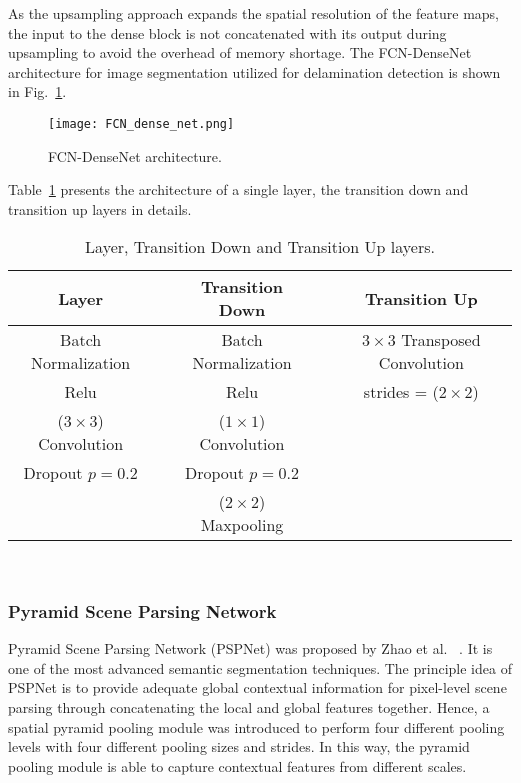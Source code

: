 As the upsampling approach expands the spatial resolution of the feature maps, the input to the dense block is not concatenated with its output during upsampling to avoid the overhead of memory shortage.
The FCN-DenseNet architecture for image segmentation utilized for delamination detection is shown in Fig.~\ref{fcn}.
\begin{figure} [h!]
	\begin{center}
		\texttt{[image: FCN\_dense\_net.png]}
	\end{center}
	\caption{FCN-DenseNet architecture.} 
	\label{fcn}
\end{figure}
Table~\ref{layers} presents the architecture of a single layer, the transition down  and transition up layers in details.
\begin{table}[h!]
	\renewcommand{\arraystretch}{1.3}
	\centering
	\scriptsize
	\resizebox{\textwidth}{!}
	{
		\begin{tabular}{ccccc}
			\hline
			Layer &  &  Transition Down &  &  Transition Up \\ 
			\hline
			Batch Normalization &  & Batch Normalization &  &  \(3\times 3\) Transposed Convolution  \\ 
			Relu &  & Relu &  & strides = (\(2\times2\))  \\ 
			(\(3\times3\)) Convolution &  & (\(1\times1\)) Convolution &  &  \\ 
			Dropout \(p=0.2\) &  &Dropout \(p=0.2\)  &  &  \\ 
			&  & (\(2\times2\)) Maxpooling &  &  \\ 
			\hline
		\end{tabular}
	}
	\caption{Layer, Transition Down and Transition Up layers.} 
	\label{layers}	
\end{table}\\
\subsubsection{Pyramid Scene Parsing Network}
Pyramid Scene Parsing Network (PSPNet) was proposed by Zhao et al.~\cite{zhao2017pyramid} .
It is one of the most advanced semantic segmentation techniques. 
The principle idea of PSPNet is to provide adequate global contextual information for pixel-level scene parsing through concatenating the local and global features together. 
Hence, a spatial pyramid pooling module was introduced to perform four different pooling levels with four different pooling sizes and strides.
In this way, the pyramid pooling module is able to capture contextual features from different scales.

